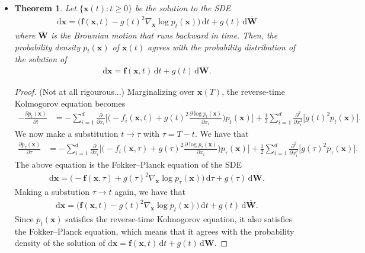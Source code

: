 \documentclass[10pt]{article}
\newtheorem{theorem}[lemma]{Theorem}
\newcommand{\dee}{\mathrm{d}}
\newcommand{\ve}[1]{\mathbf{#1}}
\begin{document}
\begin{itemize}
  \item \begin{theorem}
    Let $\{ \ve{x}(t) : t \geq 0 \}$ be the solution to the SDE
    \begin{align*}
      \dee\ve{x} = \big( \ve{f}(\ve{x},t) - g(t)^2 \nabla_{\ve{x}} \log p_t(\ve{x}) \big)\, \dee t + g(t)\, \dee \overline{\ve{W}}
    \end{align*}
    where $\overline{\ve{W}}$ is the Brownian motion that runs backward in time. Then, the probability density $p_t(\ve{x})$ of $\ve{x}(t)$ agrees with the probability distribution of the solution of
    \begin{align*}
      \dee\ve{x} = \ve{f}(\ve{x}, t)\, \dee t + g(t)\, \dee\ve{W}.
    \end{align*}
  \end{theorem}
  
  \begin{proof} (Not at all rigourous...)
    Marginalizing over $\ve{x}(T)$, the reverse-time Kolmogorov equation becomes
    \begin{align*}
      -\frac{\partial p_{t}(\ve{x})}{\partial t}
      &= - \sum_{i=1}^d \frac{\partial}{\partial x_i} \bigg[ \bigg( -f_i(\ve{x},t) + g(t)^2 \frac{\partial \log p_t(\ve{x})}{\partial x_i} \bigg) p_{t}(\ve{x}) \bigg] + \frac{1}{2} \sum_{i=1}^d \frac{\partial^2}{\partial x_i^2} \big[g(t)^2 p_{t}(\ve{x})\big].
    \end{align*}
    We now make a substitution $t \rightarrow \tau$ with $\tau = T-t$. We have that
    \begin{align*}
      \frac{\partial p_{\tau}(\ve{x})}{\partial \tau}
      &= - \sum_{i=1}^d \frac{\partial}{\partial x_i} \bigg[ \bigg( -f_i(\ve{x},\tau) + g(\tau)^2 \frac{\partial \log p_\tau(\ve{x})}{\partial x_i} \bigg) p_{\tau}(\ve{x}) \bigg] + \frac{1}{2} \sum_{i=1}^d \frac{\partial^2}{\partial x_i^2} \big[g(\tau)^2 p_{\tau}(\ve{x})\big].
    \end{align*}
    The above equation is the Fokker--Planck equation of the SDE
    \begin{align*}
      \dee \ve{x} = \Big( -\ve{f}(\ve{x},\tau) + g(\tau)^2 \nabla_{\ve{x}} \log p_\tau(\ve{x}) \Big)\, \dee\tau + g(\tau)\, \dee \overline{\ve{W}}.
    \end{align*}
    Making a substution $\tau \rightarrow t$ again, we have that
    \begin{align*}
      \dee \ve{x} = \Big( \ve{f}(\ve{x},t) - g(t)^2 \nabla_{\ve{x}} \log p_t(\ve{x}) \Big)\, \dee t + g(t)\, \dee \overline{\ve{W}}.
    \end{align*}
    Since $p_t(\ve{x})$ satisfies the reverse-time Kolmogorov equation, it also satisfies the Fokker--Planck equation, which means that it agrees with the probability density of the solution of $\dee\ve{x} = \ve{f}(\ve{x},t)\, \dee t + g(t)\, \dee\ve{W}$.
  \end{proof}
\end{itemize}


  
\end{document}
